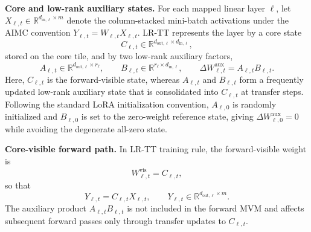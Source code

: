 \documentclass[AMA,LATO2COL]{WileyNJDv5}
\begin{document}
\noindent\textbf{Core and low-rank auxiliary states.}
For each mapped linear layer \(\ell\), let
\(X_{\ell,t}\in\mathbb{R}^{d_{\mathrm{in},\ell}\times m}\)
denote the column-stacked mini-batch activations under the AIMC convention
\(Y_{\ell,t}=W_{\ell,t}X_{\ell,t}\).
LR-TT represents the layer by a core state
\[
C_{\ell,t}\in\mathbb{R}^{d_{\mathrm{out},\ell}\times d_{\mathrm{in},\ell}},
\]
stored on the core tile, and by two low-rank auxiliary factors,
\begin{equation}
A_{\ell,t}\in\mathbb{R}^{d_{\mathrm{out},\ell}\times r_\ell},
\qquad
B_{\ell,t}\in\mathbb{R}^{r_\ell\times d_{\mathrm{in},\ell}},
\qquad
\Delta W_{\ell,t}^{\mathrm{aux}}=A_{\ell,t}B_{\ell,t}.
\label{eq:lrtt_lowrank_parameterization}
\end{equation}
Here, \(C_{\ell,t}\) is the forward-visible state, whereas \(A_{\ell,t}\) and \(B_{\ell,t}\) form a frequently updated low-rank auxiliary state that is consolidated into \(C_{\ell,t}\) at transfer steps.
Following the standard LoRA initialization convention, \(A_{\ell,0}\) is randomly initialized and \(B_{\ell,0}\) is set to the zero-weight reference state, giving
\(\Delta W_{\ell,0}^{\mathrm{aux}}=0\) while avoiding the degenerate all-zero state.

\noindent\textbf{Core-visible forward path.}
In LR-TT training rule, the forward-visible weight is
\begin{equation}
W^{\mathrm{vis}}_{\ell,t}=C_{\ell,t},
\label{eq:lrtt_visible_weight}
\end{equation}
so that
\begin{equation}
Y_{\ell,t}
=
C_{\ell,t}X_{\ell,t},
\qquad
Y_{\ell,t}\in\mathbb{R}^{d_{\mathrm{out},\ell}\times m}.
\label{eq:lrtt_layer_forward}
\end{equation}
The auxiliary product \(A_{\ell,t}B_{\ell,t}\) is not included in the forward MVM and affects subsequent forward passes only through transfer updates to \(C_{\ell,t}\).
\end{document}
